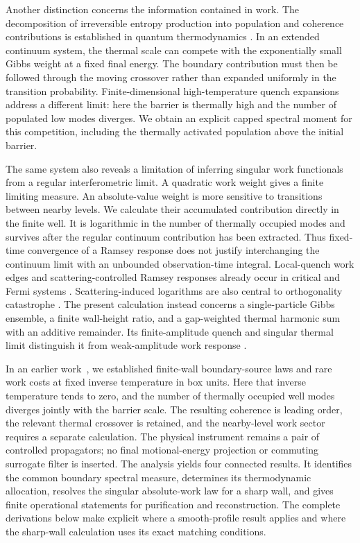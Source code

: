 \documentclass[aps,pra,reprint,superscriptaddress,longbibliography]{revtex4-2}
\begin{document}
Another distinction concerns the information contained in work.
The decomposition of irreversible entropy production into population
and coherence contributions is established in quantum thermodynamics
\cite{Francica2019}. In an extended continuum system, the thermal scale
can compete with the exponentially small Gibbs weight at a fixed final
energy. The boundary contribution must then be followed through the
moving crossover rather than expanded uniformly in the transition
probability. Finite-dimensional high-temperature quench expansions
\cite{Varizi2022} address a different limit: here the barrier is
thermally high and the number of populated low modes diverges.
We obtain an explicit capped spectral moment for this
competition, including the thermally activated population above the
initial barrier.

The same system also reveals a limitation of inferring singular work
functionals from a regular interferometric limit. A quadratic work
weight gives a finite limiting measure. An absolute-value weight is
more sensitive to transitions between nearby levels. We calculate
their accumulated contribution directly in the finite well. It is
logarithmic in the number of thermally occupied modes and survives
after the regular continuum contribution has been extracted. Thus
fixed-time convergence of a Ramsey response does not justify
interchanging the continuum limit with an unbounded observation-time
integral. Local-quench work edges and scattering-controlled Ramsey
responses already occur in critical and Fermi systems
\cite{Smacchia2012,Knap2012,Sindona2013}. Scattering-induced logarithms
are also central to orthogonality catastrophe \cite{Kuttler2014}.
The present calculation instead concerns a single-particle Gibbs
ensemble, a finite wall-height ratio, and a gap-weighted thermal
harmonic sum with an additive remainder. Its finite-amplitude quench
and singular thermal limit distinguish it from weak-amplitude work
response \cite{Guarnieri2024}.

In an earlier work~\cite{ChandruRareWork}, we established finite-wall boundary-source
laws and rare work costs at fixed inverse temperature in box units.
Here that inverse temperature tends to zero, and the number of thermally
occupied well modes diverges jointly with the barrier scale. The resulting
coherence is leading order, the relevant thermal crossover is retained,
and the nearby-level work sector requires a separate calculation.
The physical instrument remains a pair of controlled propagators;
no final motional-energy projection or commuting surrogate filter is
inserted. The analysis yields four connected results. It identifies
the common boundary spectral measure, determines its thermodynamic
allocation, resolves the singular absolute-work law for a sharp wall,
and gives finite operational statements for purification and
reconstruction. The complete derivations below make explicit where
a smooth-profile result applies and where the sharp-wall calculation
uses its exact matching conditions.
\end{document}
